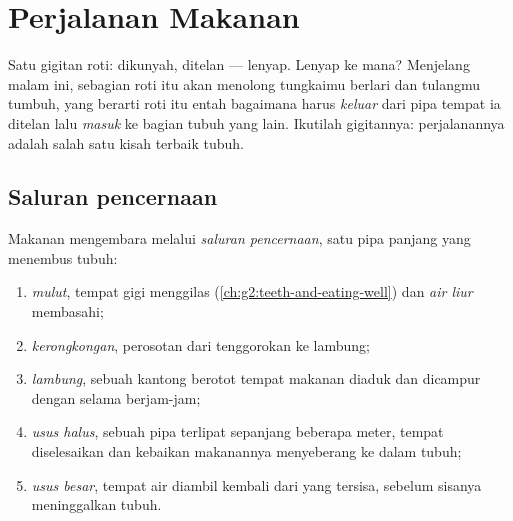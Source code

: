 \chapter{Perjalanan Makanan}\label{ch:g4:journey-of-food}

Satu gigitan roti: dikunyah, ditelan --- lenyap. Lenyap ke mana?
Menjelang malam ini, sebagian roti itu akan menolong tungkaimu berlari
dan tulangmu tumbuh, yang berarti roti itu entah bagaimana harus
\emph{keluar} dari pipa tempat ia ditelan lalu \emph{masuk} ke bagian
tubuh yang lain. Ikutilah gigitannya: perjalanannya adalah salah satu
kisah terbaik tubuh.

\section{Saluran pencernaan}

\begin{definition}\label{def:g4:journey-of-food:tract}
Makanan mengembara melalui \emph{saluran
pencernaan}, satu pipa panjang yang
menembus tubuh:
\begin{enumerate}
  \item \emph{mulut}, tempat gigi menggilas
        (\cref{ch:g2:teeth-and-eating-well}) dan \emph{air
        liur} membasahi;
  \item \emph{kerongkongan}, perosotan dari
        tenggorokan ke lambung;
  \item \emph{lambung}, sebuah kantong berotot tempat
        makanan diaduk dan dicampur dengan  selama
        berjam-jam;
  \item \emph{usus halus}, sebuah pipa terlipat
        sepanjang beberapa meter, tempat  diselesaikan dan
        kebaikan makanannya menyeberang ke dalam tubuh;
  \item \emph{usus besar}, tempat air diambil
        kembali dari yang tersisa, sebelum sisanya meninggalkan
        tubuh.
\end{enumerate}
\end{definition}

